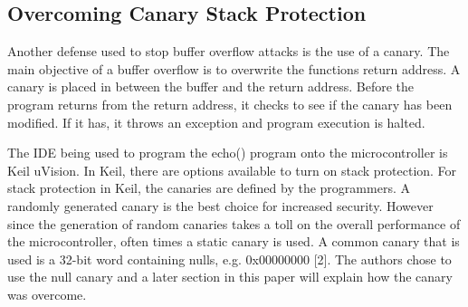 \documentclass[letterpaper, 10 pt, conference]{ieeeconf}  %
\begin{document}
\subsection{Overcoming Canary Stack Protection}

Another defense used to stop buffer overflow attacks is the use of a canary.  The main objective of a buffer overflow is to overwrite the functions return address.  A canary is placed in between the buffer and the return address.  Before the program returns from the return address, it checks to see if the canary has been modified.  If it has, it throws an exception and program execution is halted.

The IDE being used to program the echo() program onto the microcontroller is Keil uVision.  In Keil, there are options available to turn on stack protection.  For stack protection in Keil, the canaries are defined by the programmers.  A randomly generated canary is the best choice for increased security.  However since the generation of random canaries takes a toll on the overall performance of the microcontroller, often times a static canary is used.  A common canary that is used is a 32-bit word containing nulls, e.g. $0$x$00000000$ [2].  The authors chose to use the null canary and a later section in this paper will explain how the canary was overcome. 



\end{document}
